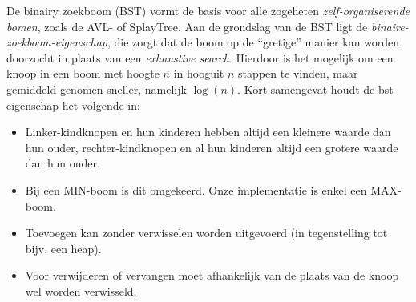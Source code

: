 \documentclass[a4paper,10pt]{article}
\begin{document}
De binairy zoekboom (BST) vormt de basis voor alle zogeheten \emph{zelf-organiserende bomen}, zoals de AVL- of SplayTree.
Aan de grondslag van de BST ligt de \emph{binaire-zoekboom-eigenschap}, die zorgt dat de boom op de ``gretige'' manier kan
worden doorzocht in plaats van een \emph{exhaustive search}. Hierdoor is het mogelijk om een knoop in een boom met hoogte $n$ in hooguit $n$ stappen te vinden, maar gemiddeld genomen sneller, namelijk $\log(n)$. Kort samengevat houdt de bst-eigenschap het volgende in:
\begin{itemize}
\item Linker-kindknopen en hun kinderen hebben altijd een kleinere waarde dan hun ouder, rechter-kindknopen en al hun kinderen altijd een grotere waarde dan hun ouder.
\item Bij een MIN-boom is dit omgekeerd. Onze implementatie is enkel een MAX-boom.
\item Toevoegen kan zonder verwisselen worden uitgevoerd (in tegenstelling tot bijv. een heap).
\item Voor verwijderen of vervangen moet afhankelijk van de plaats van de knoop wel worden verwisseld.
\end{itemize}
\begin{center}
\end{center}
\end{document}
